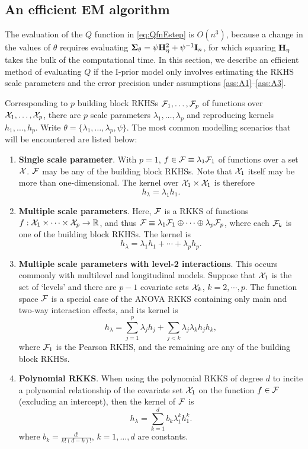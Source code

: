 \subsection{An efficient EM algorithm}
\label{sec:efficientEM1}

The evaluation of the $Q$ function in \cref{eq:QfnEstep} is $O(n^3)$, because a change in the values of $\theta$ requires evaluating ${\bm\Sigma}_\theta = \psi{\mathbf H}_\eta^2 + \psi^{-1}{\mathbf I}_n$, for which squaring ${\mathbf H}_\eta$ takes the bulk of the computational time.
In this section, we describe an efficient method of evaluating $Q$ if the I-prior model only involves estimating the RKHS scale parameters and the error precision under assumptions \ref{ass:A1}--\ref{ass:A3}.

Corresponding to $p$ building block RKHSs ${\mathcal F}_1,\dots,{\mathcal F}_p$ of functions over ${\mathcal X}_1,\dots,{\mathcal X}_p$, there are $p$ scale parameters $\lambda_1,\dots,\lambda_p$ and reproducing kernels $h_1,\dots,h_p$.
Write $\theta = \{\lambda_1,\dots,\lambda_p,\psi\}$.
The most common modelling scenarios that will be encountered are listed below:
\begin{enumerate}
  \item \textbf{Single scale parameter}. With $p=1$, $f\in{\mathcal F}\equiv \lambda_1{\mathcal F}_1$ of functions over a set ${\mathcal X}$. ${\mathcal F}$ may be any of the building block RKHSs. Note that ${\mathcal X}_1$ itself may be more than one-dimensional. The kernel over ${\mathcal X}_1\times{\mathcal X}_1$ is therefore
  \[
    h_\lambda = \lambda_1 h_1.
  \]
  \item \textbf{Multiple scale parameters}. Here, ${\mathcal F}$ is a RKKS of functions $f:{\mathcal X}_1\times\cdots\times{\mathcal X}_p\to\mathbb{R}$, and thus ${\mathcal F}\equiv \lambda_1{\mathcal F}_1 \oplus \cdots \oplus \lambda_p{\mathcal F}_p$, where each ${\mathcal F}_k$ is one of the building block RKHSs. The kernel is
  \[
    h_\lambda = \lambda_1 h_1 + \cdots + \lambda_p h_p.
  \]
  \item \textbf{Multiple scale parameters with level-2 interactions}. This occurs commonly with multilevel and longitudinal models. Suppose that ${\mathcal X}_1$ is the set of `levels' and there are $p-1$ covariate sets ${\mathcal X}_k$, $k=2,\cdots,p$. The function space ${\mathcal F}$ is a special case of the ANOVA RKKS containing only main and two-way interaction effects, and its kernel is
  \[
    h_\lambda = \sum_{j=1}^p \lambda_j h_j + \sum_{j < k} \lambda_j\lambda_k h_j h_k,
  \]
  where ${\mathcal F}_1$ is the Pearson RKHS, and the remaining are any of the building block RKHSs.
  \item \textbf{Polynomial RKKS}. When using the polynomial RKKS of degree $d$ to incite a polynomial relationship of the covariate set ${\mathcal X}_1$ on the function $f\in{\mathcal F}$ (excluding an intercept), then the kernel of ${\mathcal F}$ is
  \[
    h_\lambda = \sum_{k=1}^d b_k \lambda_1^k h_1^k.
  \]
  where $b_k = \frac{d!}{k!(d-k)!}$, $k=1,\dots,d$ are constants.
\end{enumerate}
